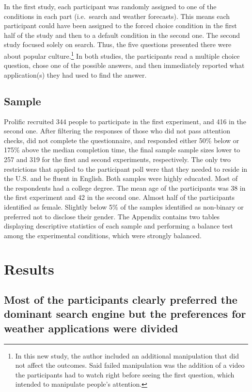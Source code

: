 \documentclass[
  11pt,
]{article}
\begin{document}
In the first study, each participant was randomly assigned to one of the conditions in each part (i.e.~search and weather forecasts). This means each participant could have been assigned to the forced choice condition in the first half of the study and then to a default condition in the second one. The second study focused solely on search. Thus, the five questions presented there were about popular culture.\footnote{In this new study, the author included an additional manipulation that did not affect the outcomes. Said failed manipulation was the addition of a video the participants had to watch right before seeing the first question, which intended to manipulate people's attention.} In both studies, the participants read a multiple choice question, chose one of the possible answers, and then immediately reported what application(s) they had used to find the answer.

\hypertarget{sample}{%
\subsection{Sample}\label{sample}}

Prolific recruited 344 people to participate in the first experiment, and 416 in the second one. After filtering the responses of those who did not pass attention checks, did not complete the questionnaire, and responded either 50\% below or 175\% above the median completion time, the final sample sample sizes lower to 257 and 319 for the first and second experiments, respectively. The only two restrictions that applied to the participant poll were that they needed to reside in the U.S. and be fluent in English. Both samples were highly educated. Most of the respondents had a college degree. The mean age of the participants was 38 in the first experiment and 42 in the second one. Almost half of the participants identified as female. Slightly below 5\% of the samples identified as non-binary or preferred not to disclose their gender. The Appendix contains two tables displaying descriptive statistics of each sample and performing a balance test among the experimental conditions, which were strongly balanced.

\hypertarget{results}{%
\section{Results}\label{results}}

\hypertarget{most-of-the-participants-clearly-preferred-the-dominant-search-engine-but-the-preferences-for-weather-applications-were-divided}{%
\subsection{Most of the participants clearly preferred the dominant search engine but the preferences for weather applications were divided}\label{most-of-the-participants-clearly-preferred-the-dominant-search-engine-but-the-preferences-for-weather-applications-were-divided}}
\end{document}
